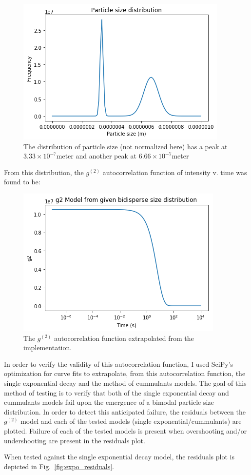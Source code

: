 \documentclass[11pt]{article}
\begin{document}
\begin{figure}
\centering
\includegraphics[width=0.5\linewidth]{bidisperse_psd.png}
\caption{The distribution of particle size (not normalized here) has a peak at $3.33\times10^{-7}$\si{meter} and another peak at $6.66\times10^{-7}$\si{meter}}
\label{fig:bidisperse_psd}
\end{figure}

From this distribution, the $g^{(2)}$ autocorrelation function of intensity v. time was found to be:

\begin{figure}
\centering
\includegraphics[width=0.5\linewidth]{g2.png}
\caption{The $g^{(2)}$ autocorrelation function extrapolated from the implementation.}
\label{fig:g2_model}
\end{figure}

In order to verify the validity of this autocorrelation function, I used SciPy's optimization for curve fits to extrapolate, from this autocorrelation function, the single exponential decay and the method of cummulants models. The goal of this method of testing is to verify that both of the single exponential decay and cummulants models fail upon the emergence of a bimodal particle size distribution. In order to detect this anticipated failure, the residuals between the $g^{(2)}$ model and each of the tested models (single exponential/cummulants) are plotted. Failure of each of the tested models is present when overshooting and/or undershooting are present in the residuals plot. 

When tested against the single exponential decay model, the residuals plot is depicted in Fig.~\ref{fig:expo_residuals}.
\end{document}

